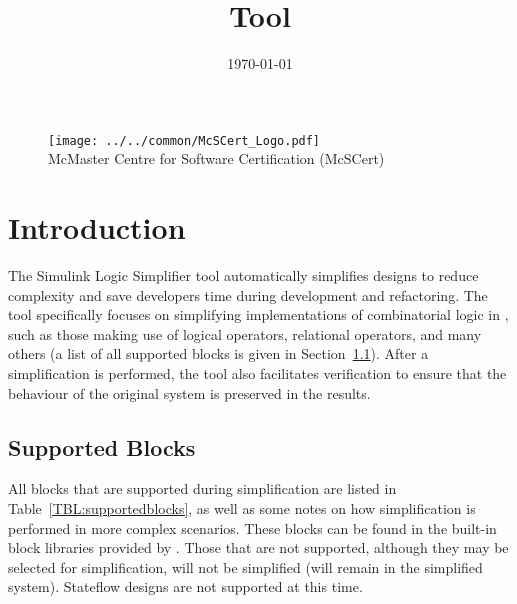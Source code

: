\documentclass{article}
\title{\ToolName Tool}
\date{\monthyeardate\today}
\makeatletter
\newcommand{\ToolName}{Simulink Logic Simplifier\@\xspace}
\makeatother
\begin{document}
\maketitle
\vfill

\begin{figure}
	\centering
	\texttt{[image: ../../common/McSCert\_Logo.pdf]} \\
	McMaster Centre for Software Certification (McSCert)
\end{figure}

\newpage

\section{Introduction}


The \ToolName tool automatically simplifies \Simulink designs to reduce complexity and save developers time during development and refactoring.
The tool specifically focuses on simplifying implementations of combinatorial logic in \Simulink, such as those making use of logical operators, relational operators, and many others (a list of all supported blocks is given in Section~\ref{SEC:supportedblocks}). After a simplification is performed, the tool also facilitates verification to ensure that the behaviour of the original system is preserved in the results.

\subsection{Supported Blocks}
\label{SEC:supportedblocks}
All \Simulink blocks that are supported during simplification are listed in Table~\ref{TBL:supportedblocks}, as well as some notes on how simplification is performed in more complex scenarios. These blocks can be found in the built-in block libraries provided by \Simulink. Those that are not supported, although they may be selected for simplification, will not be simplified (\ie will remain in the simplified system). Stateflow designs are not supported at this time.
\end{document}
